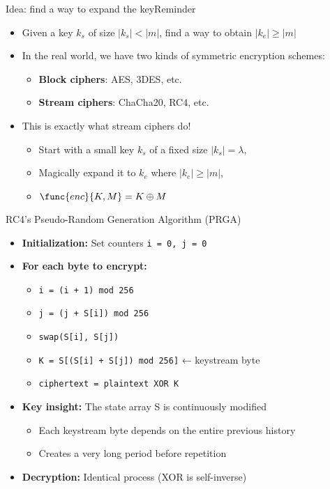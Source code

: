 \documentclass[aspectratio=169, lualatex, handout]{beamer}
\begin{document}
\begin{frame}{Idea: find a way to expand the key}{Reminder}
	\begin{itemize}
		\item Given a key $k_s$ of size $\left|k_s\right| < \left|m\right|$, find a way to obtain $\left|k_e\right| \geq \left|m\right|$
		\item In the real world, we have two kinds of symmetric encryption schemes:
		      \begin{itemize}
			      \item \textbf{Block ciphers}: AES, 3DES, etc.
			      \item \textbf{Stream ciphers}: ChaCha20, RC4, etc.
		      \end{itemize}
		\item This is exactly what stream ciphers do!
		      \begin{itemize}
			      \item Start with a small key $k_s$ of a fixed size $\left|k_s\right| = \lambda$,
			      \item Magically expand it to $k_e$ where $\left|k_e\right| \geq \left|m\right|$,
			      \item $\func{enc}{K, M} = K \oplus M$
		      \end{itemize}
	\end{itemize}
\end{frame}

\begin{frame}{RC4's Pseudo-Random Generation Algorithm (PRGA)}
	\begin{itemize}
		\item \textbf{Initialization:} Set counters \texttt{i = 0, j = 0}
		\item \textbf{For each byte to encrypt:}
		      \begin{itemize}
			      \item \texttt{i = (i + 1) mod 256}
			      \item \texttt{j = (j + S[i]) mod 256}
			      \item \texttt{swap(S[i], S[j])}
			      \item \texttt{K = S[(S[i] + S[j]) mod 256]} \quad ← keystream byte
			      \item \texttt{ciphertext = plaintext XOR K}
		      \end{itemize}
		\item \textbf{Key insight:} The state array S is continuously modified
		      \begin{itemize}
			      \item Each keystream byte depends on the entire previous history
			      \item Creates a very long period before repetition
		      \end{itemize}
		\item \textbf{Decryption:} Identical process (XOR is self-inverse)
	\end{itemize}
\end{frame}
\end{document}
